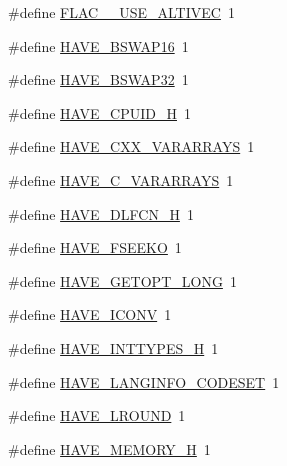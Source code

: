 \begin{DoxyCompactItemize}
\item 
\#define \hyperlink{mac_2config_2i386_2lib-src_2libflac_2config_8h_a7acb0613b7efd0cf82e9d2ab450c5f0b}{F\+L\+A\+C\+\_\+\+\_\+\+U\+S\+E\+\_\+\+A\+L\+T\+I\+V\+EC}~1
\item 
\#define \hyperlink{mac_2config_2i386_2lib-src_2libflac_2config_8h_a0f598c653a8b9e6fea6ba44b10e513e8}{H\+A\+V\+E\+\_\+\+B\+S\+W\+A\+P16}~1
\item 
\#define \hyperlink{mac_2config_2i386_2lib-src_2libflac_2config_8h_a72e19e92aa17ef134b36955a1c2ce05e}{H\+A\+V\+E\+\_\+\+B\+S\+W\+A\+P32}~1
\item 
\#define \hyperlink{mac_2config_2i386_2lib-src_2libflac_2config_8h_ab461d67d5ed670c8609565bda75d2d6f}{H\+A\+V\+E\+\_\+\+C\+P\+U\+I\+D\+\_\+H}~1
\item 
\#define \hyperlink{mac_2config_2i386_2lib-src_2libflac_2config_8h_a472db9b9336459eba451196ccc54fcb8}{H\+A\+V\+E\+\_\+\+C\+X\+X\+\_\+\+V\+A\+R\+A\+R\+R\+A\+YS}~1
\item 
\#define \hyperlink{mac_2config_2i386_2lib-src_2libflac_2config_8h_a7b0d7675e3b4acc0220a9601ac8de974}{H\+A\+V\+E\+\_\+\+C\+\_\+\+V\+A\+R\+A\+R\+R\+A\+YS}~1
\item 
\#define \hyperlink{mac_2config_2i386_2lib-src_2libflac_2config_8h_a0ee1617ff2f6885ef384a3dd46f9b9d7}{H\+A\+V\+E\+\_\+\+D\+L\+F\+C\+N\+\_\+H}~1
\item 
\#define \hyperlink{mac_2config_2i386_2lib-src_2libflac_2config_8h_a15584f56d115b955377103a0cca9ead1}{H\+A\+V\+E\+\_\+\+F\+S\+E\+E\+KO}~1
\item 
\#define \hyperlink{mac_2config_2i386_2lib-src_2libflac_2config_8h_a7d8d14d69f60bd296d253130f912bfc0}{H\+A\+V\+E\+\_\+\+G\+E\+T\+O\+P\+T\+\_\+\+L\+O\+NG}~1
\item 
\#define \hyperlink{mac_2config_2i386_2lib-src_2libflac_2config_8h_ab60b60ba255fd3b42f5a28a6d5e37e4a}{H\+A\+V\+E\+\_\+\+I\+C\+O\+NV}~1
\item 
\#define \hyperlink{mac_2config_2i386_2lib-src_2libflac_2config_8h_ab90a030ff2790ebdc176660a6dd2a478}{H\+A\+V\+E\+\_\+\+I\+N\+T\+T\+Y\+P\+E\+S\+\_\+H}~1
\item 
\#define \hyperlink{mac_2config_2i386_2lib-src_2libflac_2config_8h_aa6ac9015e081885c7f9f780bc4b05ca6}{H\+A\+V\+E\+\_\+\+L\+A\+N\+G\+I\+N\+F\+O\+\_\+\+C\+O\+D\+E\+S\+ET}~1
\item 
\#define \hyperlink{mac_2config_2i386_2lib-src_2libflac_2config_8h_a4f6ff4162269254c4c4b86bc9892ecce}{H\+A\+V\+E\+\_\+\+L\+R\+O\+U\+ND}~1
\item 
\#define \hyperlink{mac_2config_2i386_2lib-src_2libflac_2config_8h_ae93a78f9d076138897af441c9f86f285}{H\+A\+V\+E\+\_\+\+M\+E\+M\+O\+R\+Y\+\_\+H}~1

\end{DoxyCompactItemize}
